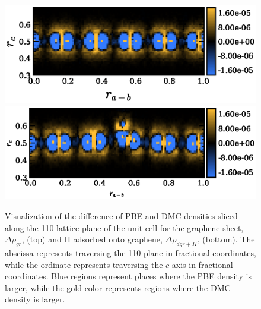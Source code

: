 \begin{figure}
    \centering
    \includegraphics[width=\columnwidth,keepaspectratio]{Images/chapter4/qmc_2d_slice_graphene.eps}
    \includegraphics[width=\columnwidth,keepaspectratio]{Images/chapter4/qmc_2d_slice_hgraphene.eps}
    \caption{Visualization of the difference of PBE and DMC densities sliced along the 110 lattice plane of the unit cell for the graphene sheet, $\Delta\rho_{gr}$, (top) and H adsorbed onto graphene, $\Delta\rho_{dgr+H}$, (bottom). The abscissa represents traversing the 110 plane in fractional coordinates, while the ordinate represents traversing the $c$ axis in fractional coordinates. Blue regions represent places where the PBE density is larger, while the gold color represents regions where the DMC density is larger. }
    \label{fig:densdiff_dmcminusdft}
\end{figure}

